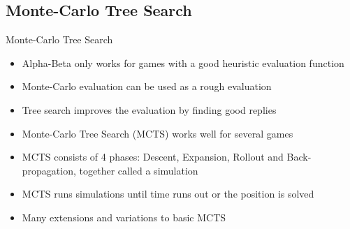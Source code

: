 \documentclass{beamer} %
\begin{document}


\subsection{Monte-Carlo Tree Search}

\begin{frame}{Monte-Carlo Tree Search}
\begin{itemize}
	\item Alpha-Beta only works for games with a good heuristic evaluation function
	\item Monte-Carlo evaluation can be used as a rough evaluation
	\item Tree search improves the evaluation by finding good replies
	\item Monte-Carlo Tree Search (MCTS) works well for several games
	\item MCTS consists of 4 phases: Descent, Expansion, Rollout and Back-propagation, together called a simulation
	\item MCTS runs simulations until time runs out or the position is solved
	\item Many extensions and variations to basic MCTS
\end{itemize}
\end{frame}
\end{document}
